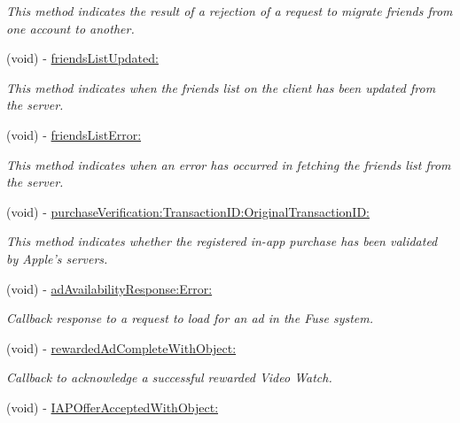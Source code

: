 \begin{DoxyCompactItemize}
\begin{DoxyCompactList}\small\item\em This method indicates the result of a rejection of a request to migrate friends from one account to another. \end{DoxyCompactList}\item 
(void) -\/ \hyperlink{protocol_fuse_delegate-p_a4b29ca96b491f3ac8548a85983aa0cff}{friends\+List\+Updated\+:}
\begin{DoxyCompactList}\small\item\em This method indicates when the friends list on the client has been updated from the server. \end{DoxyCompactList}\item 
(void) -\/ \hyperlink{protocol_fuse_delegate-p_a071433b93b221cbab7c0f112903e4718}{friends\+List\+Error\+:}
\begin{DoxyCompactList}\small\item\em This method indicates when an error has occurred in fetching the friends list from the server. \end{DoxyCompactList}\item 
(void) -\/ \hyperlink{protocol_fuse_delegate-p_a74e3e8647db995888bdf94c64d5ad26b}{purchase\+Verification\+:\+Transaction\+I\+D\+:\+Original\+Transaction\+I\+D\+:}
\begin{DoxyCompactList}\small\item\em This method indicates whether the registered in-\/app purchase has been validated by Apple's servers. \end{DoxyCompactList}\item 
(void) -\/ \hyperlink{protocol_fuse_delegate-p_ad9af5fda0a2199ba2a9a2bafab2f4a82}{ad\+Availability\+Response\+:\+Error\+:}
\begin{DoxyCompactList}\small\item\em Callback response to a request to load for an ad in the Fuse system. \end{DoxyCompactList}\item 
(void) -\/ \hyperlink{protocol_fuse_delegate-p_a3e81f123e745af07c58156c154c13cdc}{rewarded\+Ad\+Complete\+With\+Object\+:}
\begin{DoxyCompactList}\small\item\em Callback to acknowledge a successful rewarded Video Watch. \end{DoxyCompactList}\item 
(void) -\/ \hyperlink{protocol_fuse_delegate-p_ad46a55d7852f92e7615ce5168141bc7a}{I\+A\+P\+Offer\+Accepted\+With\+Object\+:}

\end{DoxyCompactItemize}
